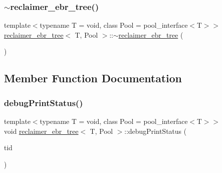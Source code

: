 \mbox{\label{classreclaimer__ebr__tree_a12b133bbaac8b15c30f42bfa35a89130}} 
\subsubsection{\texorpdfstring{$\sim$reclaimer\+\_\+ebr\+\_\+tree()}{~reclaimer\_ebr\_tree()}}
{\footnotesize\ttfamily template$<$typename T  = void, class Pool  = pool\+\_\+interface$<$\+T$>$$>$ \\
\hyperlink{classreclaimer__ebr__tree}{reclaimer\+\_\+ebr\+\_\+tree}$<$ T, Pool $>$\+::$\sim$\hyperlink{classreclaimer__ebr__tree}{reclaimer\+\_\+ebr\+\_\+tree} (\begin{DoxyParamCaption}{ }\end{DoxyParamCaption})\hspace{0.3cm}{\ttfamily [inline]}}



\subsection{Member Function Documentation}
\mbox{\label{classreclaimer__ebr__tree_ab1987de4ed6253f4ff15790660791c44}} 
\subsubsection{\texorpdfstring{debug\+Print\+Status()}{debugPrintStatus()}}
{\footnotesize\ttfamily template$<$typename T  = void, class Pool  = pool\+\_\+interface$<$\+T$>$$>$ \\
void \hyperlink{classreclaimer__ebr__tree}{reclaimer\+\_\+ebr\+\_\+tree}$<$ T, Pool $>$\+::debug\+Print\+Status (\begin{DoxyParamCaption}\item[{const int}]{tid }\end{DoxyParamCaption})\hspace{0.3cm}{\ttfamily [inline]}}

